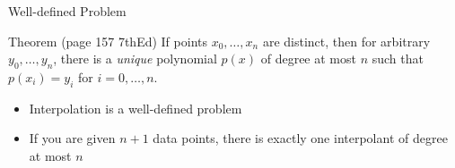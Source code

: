 \documentclass[10pt]{beamer}
\begin{document}
\begin{frame}{Well-defined Problem}
    \begin{block}{Theorem (page 157 7thEd)}
  If points $x_0,\dots,x_n$ are distinct, then for arbitrary $y_0,\dots,y_n$,
there is a \emph{unique} polynomial $p(x)$ of degree at most $n$ such that
$p(x_i)=y_i$ for $i=0,\dots,n$.
\end{block}
\vfill 
\begin{itemize}
    \item Interpolation is a well-defined problem 
\vfill 
    \item If you are given $n+1$ data points, there is exactly one interpolant of degree at most $n$
\vfill
\end{itemize}

\end{frame}
\end{document}
